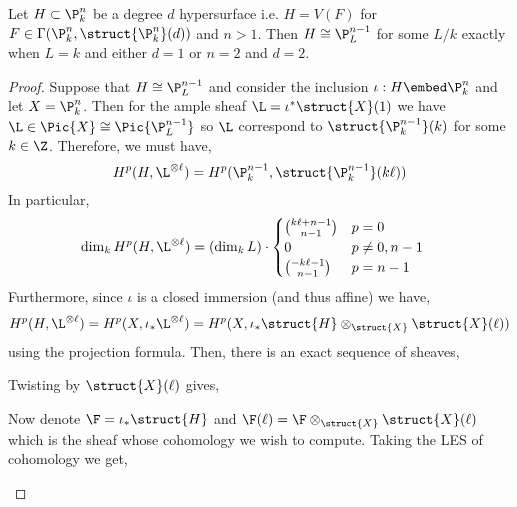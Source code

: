 \documentclass[12pt]{article}
\begin{document}
\begin{theorem}
Let $H \subset \P^n_k$ be a degree $d$ hypersurface i.e. $H = V(F)$ for $F \in \Gamma(\P^n_k, \struct{\P^n_k}(d))$ and $n > 1$. Then $H \cong \P^{n-1}_L$ for some $L / k$ exactly when $L = k$ and either $d = 1$ or $n = 2$ and $d = 2$. 
\end{theorem}

\begin{proof}
Suppose that $H \cong \P^{n-1}_L$ and consider the inclusion $\iota : H \embed \P^n_k$ and let $X = \P^n_k$. Then for the ample sheaf $\L = \iota^* \struct{X}(1)$ we have $\L \in \Pic{X} \cong \Pic{\P^{n-1}_L}$ so $\L$ correspond to $\struct{\P^{n-1}_k}(k)$ for some $k \in \Z$. Therefore, we must have,
\[ H^p(H, \L^{\otimes \ell}) = H^p(\P^{n-1}_k, \struct{\P^{n-1}_k}(k\ell)) \]
In particular, 
\begin{align*}
\dim_k H^p(H, \L^{\otimes \ell}) & = (\dim_k L) \cdot
\begin{cases}
{ k \ell + n-1 \choose n-1 } & p = 0
\\
0 & p \neq 0, n-1 
\\
{ - k \ell - 1 \choose n - 1} & p = n-1
\end{cases} 
\end{align*}
Furthermore, since $\iota$ is a closed immersion (and thus affine) we have,
\[ H^p(H, \L^{\otimes \ell}) = H^p(X, \iota_* \L^{\otimes \ell}) = H^p(X, \iota_* \struct{H} \otimes_{\struct{X}} \struct{X}(\ell)) \]
using the projection formula. Then, there is an exact sequence of sheaves,
\begin{center}
\end{center}
Twisting by $\struct{X}(\ell)$ gives,
\begin{center}
\end{center}
Now denote $\F = \iota_* \struct{H}$ and $\F(\ell) = \F \otimes_{\struct{X}} \struct{X}(\ell)$ which is the sheaf whose cohomology we wish to compute. Taking the LES of cohomology we get,
\begin{center}
\begin{tikzcd}

\end{tikzcd}
\end{center}
\end{proof}
\end{document}
